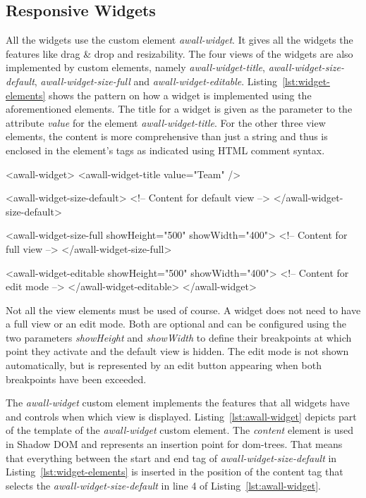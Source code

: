 \documentclass{sigchi}
\begin{document}
\subsection{Responsive Widgets}
All the widgets use the custom element \textit{awall-widget}.
It gives all the widgets the features like drag \& drop and resizability.
The four views of the widgets are also implemented by custom elements, namely \textit{awall-widget-title}, \textit{awall-widget-size-default}, \textit{awall-widget-size-full} and \textit{awall-widget-editable}.
Listing~\ref{lst:widget-elements} shows the pattern on how a widget is implemented using the aforementioned elements.
The title for a widget is given as the parameter to the attribute \textit{value} for the element \textit{awall-widget-title}.
For the other three view elements, the content is more comprehensive than just a string and thus is enclosed in the element's tags as indicated using HTML comment syntax.

\begin{code}[caption={HTML elements for the widget's different views.},label=lst:widget-elements]
<awall-widget>
  <awall-widget-title value="Team" />

  <awall-widget-size-default>
    <!-- Content for default view -->
  </awall-widget-size-default>

  <awall-widget-size-full showHeight="500" showWidth="400">
    <!-- Content for full view -->
  </awall-widget-size-full>

  <awall-widget-editable showHeight="500" showWidth="400">
    <!-- Content for edit mode -->
  </awall-widget-editable>
</awall-widget>
\end{code}

Not all the view elements must be used of course.
A widget does not need to have a full view or an edit mode.
Both are optional and can be configured using the two parameters \textit{showHeight} and \textit{showWidth} to define their breakpoints at which point they activate and the default view is hidden.
The edit mode is not shown automatically, but is represented by an edit button appearing when both breakpoints have been exceeded.


The \textit{awall-widget} custom element implements the features that all widgets have and controls when which view is displayed.
Listing~\ref{lst:awall-widget} depicts part of the template of the \textit{awall-widget} custom element.
The \textit{content} element is used in Shadow DOM and represents an insertion point for \gls{dom}-trees.
That means that everything between the start and end tag of \textit{awall-widget-size-default} in Listing~\ref{lst:widget-elements} is inserted in the position of the content tag that selects the \textit{awall-widget-size-default} in line 4 of Listing~\ref{lst:awall-widget}.
\end{document}
